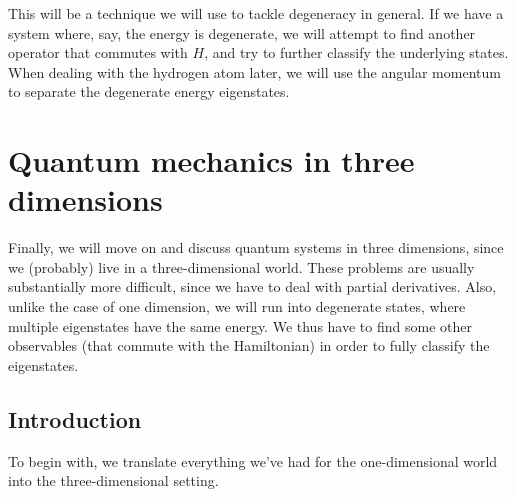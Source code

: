 \documentclass[a4paper]{article}
\begin{document}
This will be a technique we will use to tackle degeneracy in general. If we have a system where, say, the energy is degenerate, we will attempt to find another operator that commutes with $H$, and try to further classify the underlying states. When dealing with the hydrogen atom later, we will use the angular momentum to separate the degenerate energy eigenstates.

\section{Quantum mechanics in three dimensions}
Finally, we will move on and discuss quantum systems in three dimensions, since we (probably) live in a three-dimensional world. These problems are usually substantially more difficult, since we have to deal with partial derivatives. Also, unlike the case of one dimension, we will run into degenerate states, where multiple eigenstates have the same energy. We thus have to find some other observables (that commute with the Hamiltonian) in order to fully classify the eigenstates.

\subsection{Introduction}
To begin with, we translate everything we've had for the one-dimensional world into the three-dimensional setting.
\end{document}
